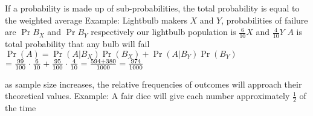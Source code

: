 \documentclass{article}
\begin{document}
\begin{multicols*}{2}
\begin{outline}[compactitem]
  \1 If a probability is made up of sub-probabilities, the total probability is equal to the weighted average
  \1 Example:
    \2 Lightbulb makers $X$ and $Y$, probabilities of failure are $\Pr{B_X}$ and $\Pr{B_Y}$ respectively
    \2 our lightbulb population is $\frac{6}{10}X$ and $\frac{4}{10}Y$
    \2 $A$ is total probability that any bulb will fail
    \2 ${\Pr(A)
    =\Pr(A|B_X)}{\Pr(B_X)}+{\Pr(A|B_Y)}{\Pr(B_Y)}$
    \\$={99 \over 100}\cdot{6 \over 10}+{95 \over 100}\cdot{4 \over 10}
    ={{594 + 380} \over 1000}={974 \over 1000}$


  \1 as sample size increases, the relative frequencies of outcomes will approach their theoretical values.
  \1 Example: A fair dice will give each number approximately $\frac{1}{2}$ of the time

\end{outline}
\end{multicols*}
\end{document}
